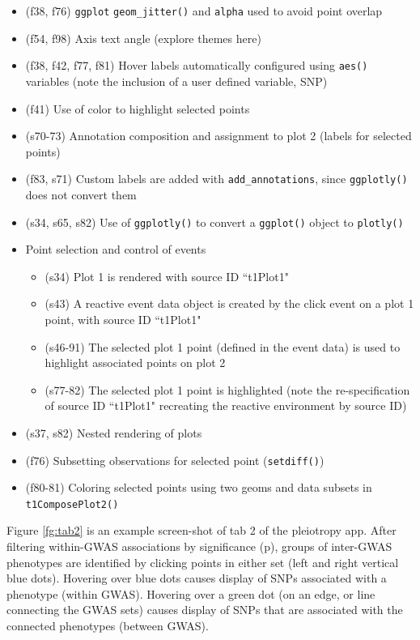 \documentclass[10pt, letterpaper]{article}
\begin{document}
\begin{spacing}{1.0}
\begin{itemize}
  \item (f38, f76) \texttt{ggplot} \texttt{geom\_jitter()} and \texttt{alpha} used to avoid point overlap
  \item (f54, f98) Axis text angle (explore themes here)
  \item (f38, f42, f77, f81) Hover labels automatically configured using \texttt{aes()} variables (note the inclusion of a user defined variable, SNP)
  \item (f41) Use of color to highlight selected points
  \item (s70-73) Annotation composition and assignment to plot 2 (labels for selected points)
  \item (f83, s71) Custom labels are added with \texttt{add\_annotations}, since \texttt{ggplotly()} does not convert them
  \item (s34, s65, s82) Use of \texttt{ggplotly()} to convert a \texttt{ggplot()} object to \texttt{plotly()}
  \item Point selection and control of events
  \begin{itemize}
      \item (s34) Plot 1 is rendered with source ID ``t1Plot1"
      \item (s43) A reactive event data object is created by the click event on a plot 1 point, with source ID ``t1Plot1"
      \item (s46-91) The selected plot 1 point (defined in the event data) is used to highlight associated points on plot 2
      \item (s77-82) The selected plot 1 point is highlighted (note the re-specification of source ID ``t1Plot1" recreating the reactive environment by source ID)
  \end{itemize}
  \item (s37, s82) Nested rendering of plots 
  \item (f76) Subsetting observations for selected point (\texttt{setdiff()})
  \item (f80-81) Coloring selected points using two geoms and data subsets in \texttt{t1ComposePlot2()}
\end{itemize}

\vspace{0.25in}

Figure \ref{fg:tab2} is an example screen-shot of tab 2 of the pleiotropy app.  After filtering within-GWAS associations by significance (p), groups of inter-GWAS phenotypes are identified by clicking points in either set (left and right vertical blue dots).  Hovering over blue dots causes display of SNPs associated with a phenotype (within GWAS).  Hovering over a green dot (on an edge, or line connecting the GWAS sets) causes display of SNPs that are associated with the connected phenotypes (between GWAS). 


\end{spacing}
\end{document}
